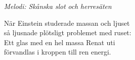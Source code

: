{\footnotesize\textit{Melodi: Skånska slot och herresäten}}\par
\vspace{10pt}
När Einstein studerade massan och ljuset\\
så ljusnade plötsligt problemet med ruset:\\
Ett glas med en hel massa Renat uti\\
förvandlas i kroppen till ren energi.
